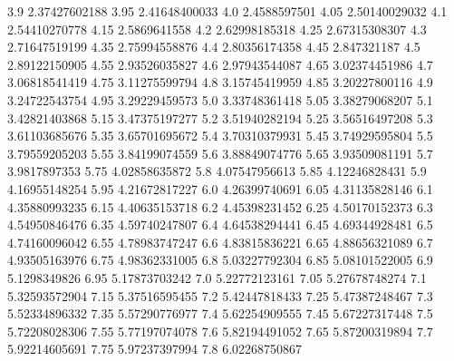             3.9    2.37427602188
           3.95    2.41648400033
            4.0     2.4588597501
           4.05    2.50140029032
            4.1    2.54410270778
           4.15     2.5869641558
            4.2    2.62998185318
           4.25    2.67315308307
            4.3    2.71647519199
           4.35    2.75994558876
            4.4    2.80356174358
           4.45      2.847321187
            4.5    2.89122150905
           4.55    2.93526035827
            4.6    2.97943544087
           4.65    3.02374451986
            4.7    3.06818541419
           4.75    3.11275599794
            4.8    3.15745419959
           4.85    3.20227800116
            4.9    3.24722543754
           4.95    3.29229459573
            5.0    3.33748361418
           5.05    3.38279068207
            5.1    3.42821403868
           5.15    3.47375197277
            5.2    3.51940282194
           5.25    3.56516497208
            5.3    3.61103685676
           5.35    3.65701695672
            5.4    3.70310379931
           5.45    3.74929595804
            5.5    3.79559205203
           5.55    3.84199074559
            5.6    3.88849074776
           5.65    3.93509081191
            5.7     3.9817897353
           5.75    4.02858635872
            5.8    4.07547956613
           5.85    4.12246828431
            5.9    4.16955148254
           5.95    4.21672817227
            6.0    4.26399740691
           6.05    4.31135828146
            6.1    4.35880993235
           6.15    4.40635153718
            6.2    4.45398231452
           6.25    4.50170152373
            6.3    4.54950846476
           6.35    4.59740247807
            6.4    4.64538294441
           6.45    4.69344928481
            6.5    4.74160096042
           6.55    4.78983747247
            6.6    4.83815836221
           6.65    4.88656321089
            6.7    4.93505163976
           6.75    4.98362331005
            6.8    5.03227792304
           6.85    5.08101522005
            6.9     5.1298349826
           6.95    5.17873703242
            7.0    5.22772123161
           7.05    5.27678748274
            7.1    5.32593572904
           7.15    5.37516595455
            7.2    5.42447818433
           7.25    5.47387248467
            7.3    5.52334896332
           7.35    5.57290776977
            7.4    5.62254909555
           7.45    5.67227317448
            7.5    5.72208028306
           7.55    5.77197074078
            7.6    5.82194491052
           7.65    5.87200319894
            7.7    5.92214605691
           7.75    5.97237397994
            7.8    6.02268750867

